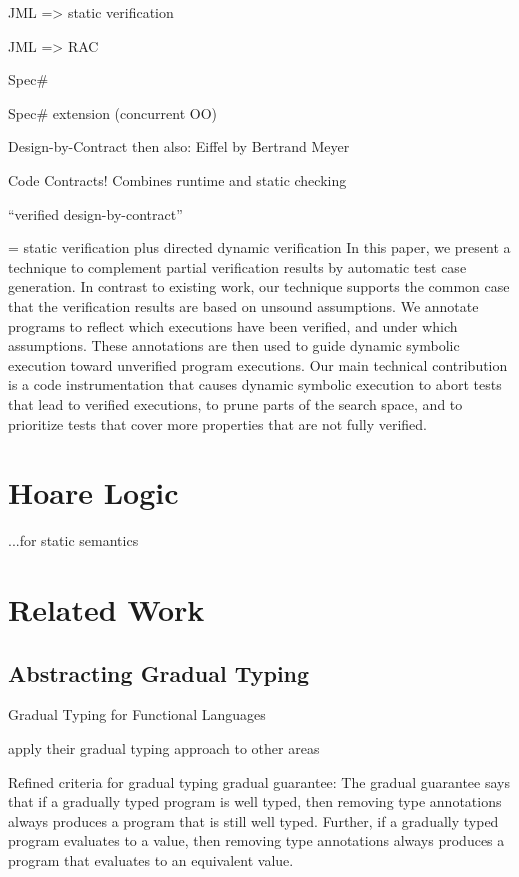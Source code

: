 \cite{jacobs2001logic} JML => static verification

\cite{cheon2002runtime} JML => RAC

\cite{the-spec-programming-system-an-overview} Spec\#

\cite{a-statically-verifiable-programming-model-for-concurrent-object-oriented-programs} Spec\# extension (concurrent OO)

\cite{meyer2002design} Design-by-Contract
then also: Eiffel by Bertrand Meyer 

\cite{embedded-contract-languages} Code Contracts! Combines runtime and static checking

\cite{crocker2004safe} “verified design-by-contract”

\cite{ChristakisMuellerWuestholz16}
= static verification plus directed dynamic verification
In this paper, we present a technique to complement partial
verification results by automatic test case generation. In
contrast to existing work, our technique supports the common
case that the verification results are based on unsound
assumptions. We annotate programs to reflect which executions
have been verified, and under which assumptions.
These annotations are then used to guide dynamic symbolic
execution toward unverified program executions. Our main
technical contribution is a code instrumentation that causes
dynamic symbolic execution to abort tests that lead to verified
executions, to prune parts of the search space, and to
prioritize tests that cover more properties that are not fully
verified.

\section{Hoare Logic}
...for static semantics

\cite{hoare1969axiomatic}

\section{Related Work}
\subsection{Abstracting Gradual Typing}
\cite{siek2006gradual}
Gradual Typing for Functional Languages

apply their gradual typing approach to other areas

\cite{siek2015refined}
Refined criteria for gradual typing
gradual guarantee:
     The gradual guarantee says that if a gradually typed program is
     well typed, then removing type annotations always produces a program that is still well typed.
     Further, if a gradually typed program evaluates to a value, then removing type annotations
     always produces a program that evaluates to an equivalent value.
     
